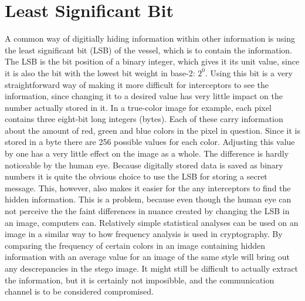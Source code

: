 \section{Least Significant Bit}
A common way of digitially hiding information within other information is using the least significant bit (LSB) of the vessel, which is to contain the information. 
The LSB is the bit position of a binary integer, which gives it its unit value, since it is also the bit with the lowest bit weight in base-2: $2^0$.
Using this bit is a very straightforward way of making it more difficult for interceptors to see the information, since changing it to a desired value has very little impact on the number actually stored in it.
In a true-color image for example, each pixel contains three eight-bit long integers (bytes). Each of these carry information about the amount of red, green and blue colors in the pixel in question.
Since it is stored in a byte there are 256 possible values for each color. Adjusting this value by one has a very little effect on the image as a whole. The difference is hardly noticeable by the human eye.
Because digitally stored data is saved as binary numbers it is quite the obvious choice to use the LSB for storing a secret message. This, however, also makes it easier for the any interceptors to find the hidden information.
This is a problem, because even though the human eye can not perceive the the faint differences in nuance created by changing the LSB in an image, computers can. 
Relatively simple statistical analyses can be used on an image in a similar way to how frequency analysis is used in cryptography. 
By comparing the frequency of certain colors in an image containing hidden information with an average value for an image of the same style will bring out any descrepancies in the stego image. 
It might still be difficult to actually extract the information, but it is certainly not imposibble, and the communication channel is to be considered compromised.